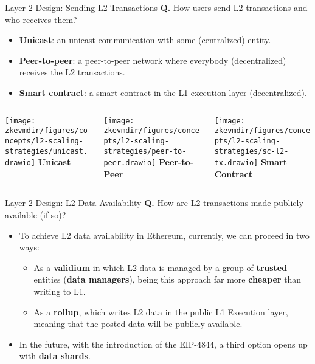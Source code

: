 \begin{frame}{Layer 2 Design: Sending L2 Transactions}
\textbf{Q.} How users send L2 transactions and who receives them?
  \begin{itemize}
  \item \textbf{Unicast}: an unicast communication with some (centralized) entity.
  \item \textbf{Peer-to-peer}: a peer-to-peer network where everybody (decentralized) receives the L2 transactions.
  \item \textbf{Smart contract}: a smart contract in the L1 execution layer (decentralized).
  \end{itemize}

\vspace{1em}

\begin{columns}[t]

\begin{column}{0.3 \textwidth}
\centering
\texttt{[image: \\zkevmdir/figures/concepts/l2-scaling-strategies/unicast.drawio]}
\textbf{Unicast}
\end{column}

\begin{column}{0.3 \textwidth}
\centering
\texttt{[image: \\zkevmdir/figures/concepts/l2-scaling-strategies/peer-to-peer.drawio]}
\textbf{Peer-to-Peer}
\end{column}

\begin{column}{0.3 \textwidth}
\centering
\texttt{[image: \\zkevmdir/figures/concepts/l2-scaling-strategies/sc-l2-tx.drawio]}
\textbf{Smart Contract}
\end{column}

\end{columns}

\end{frame}




\begin{frame}{Layer 2 Design: L2 Data Availability}
\textbf{Q.} How are L2 transactions made publicly available (if so)?
\begin{itemize}
\item To achieve L2 data availability in Ethereum, currently, we can proceed in two ways:
  \begin{itemize}
  \item As a \textbf{validium} in which L2 data is managed by a group of \textbf{trusted} entities (\textbf{data managers}), being
  this approach far more \textbf{cheaper} than writing to L1.
  \item As a \textbf{rollup}, which writes L2 data in the public L1 Execution layer, meaning that the posted data will be publicly available.
  \end{itemize}
\item In the future, with the introduction of the EIP-4844, a third option opens up with \textbf{data shards}.
\end{itemize}
\end{frame}





